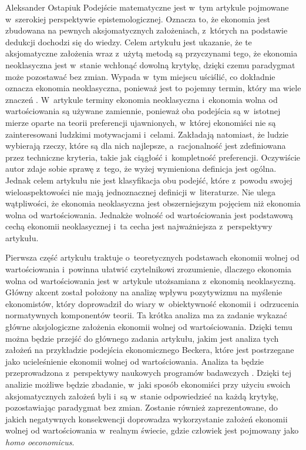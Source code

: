 \begin{artplenv}{Aleksander Ostapiuk}
Podejście matematyczne jest w~tym artykule pojmowane w~szerokiej perspektywie epistemologicznej. Oznacza to, że ekonomia
jest zbudowana na pewnych aksjomatycznych założeniach, z~których na podstawie dedukcji dochodzi się do wiedzy. Celem
artykułu jest ukazanie, że te aksjomatyczne założenia wraz z~użytą metodą są przyczynami tego, że ekonomia neoklasyczna
jest w~stanie wchłonąć dowolną krytykę, dzięki czemu paradygmat może pozostawać bez zmian. Wypada w~tym miejscu
uściślić, co dokładnie oznacza ekonomia neoklasyczna, ponieważ jest to pojemny termin, który ma wiele znaczeń
\parencite{colander_death_2000}.
W~artykule terminy ekonomia neoklasyczna i~ekonomia wolna od wartościowania
są używane zamiennie, ponieważ oba podejścia są w~istotnej mierze oparte na teorii preferencji ujawnionych, w~której
ekonomiści nie są zainteresowani ludzkimi motywacjami i~celami. Zakładają natomiast, że ludzie wybierają rzeczy, które
są dla nich najlepsze, a~racjonalność jest zdefiniowana przez techniczne kryteria, takie jak ciągłość i~kompletność
preferencji. Oczywiście autor zdaje sobie sprawę z~tego, że wyżej wymieniona definicja jest ogólna. Jednak celem
artykułu nie jest klasyfikacja obu podejść, które z~powodu swojej wieloaspektowości nie mają jednoznacznej
definicji w~literaturze. Nie ulega wątpliwości, że ekonomia neoklasyczna jest obszerniejszym pojęciem niż ekonomia wolna od
wartościowania. Jednakże wolność od wartościowania jest podstawową cechą ekonomii neoklasycznej
\parencite{sen_rational_1977,putnam_end_2011,hausman_etyka_2017_ost}
i~ta cecha jest
najważniejsza z~perspektywy artykułu. 

Pierwsza część artykułu traktuje o~teoretycznych podstawach ekonomii wolnej od wartościowania i~powinna ułatwić
czytelnikowi zrozumienie, dlaczego ekonomia wolna od wartościowania jest w~artykule utożsamiana z~ekonomią
neoklasyczną. Główny akcent został położony na analizę wpływu pozytywizmu na myślenie ekonomistów, który doprowadził do
wiary w~obiektywność ekonomii i~odrzucenia normatywnych komponentów teorii. Ta krótka analiza ma za zadanie wykazać
główne aksjologiczne założenia ekonomii wolnej od wartościowania. Dzięki temu można będzie przejść do głównego zadania
artykułu, jakim jest analiza tych założeń na przykładzie podejścia ekonomicznego Beckera, które jest
postrzegane jako ucieleśnienie ekonomii wolnej od wartościowania. Analiza ta będzie
przeprowadzona z~perspektywy naukowych programów badawczych
\parencite{lakatos_methodology_1980,lakatos_pisma_1995}.
Dzięki tej analizie możliwe
będzie zbadanie, w~jaki sposób ekonomiści przy użyciu swoich aksjomatycznych założeń byli i~są w~stanie odpowiedzieć na
każdą krytykę, pozostawiając paradygmat bez zmian. Zostanie również zaprezentowane, do jakich negatywnych konsekwencji
doprowadza wykorzystanie założeń ekonomii wolnej od wartościowania w~realnym świecie, gdzie człowiek jest pojmowany
jako \textit{homo oeconomicus}.


\end{artplenv}
